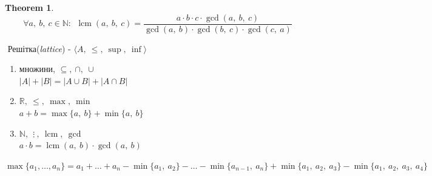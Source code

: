 \documentclass[a4paper,12pt, centered]{bookest}
\newtheorem{theorem}{Theorem}[section]
\DeclareMathOperator{\lcm}{lcm}
\begin{document}
\begin{theorem}
$$\forall a,\>b,\>c\in\mathbb{N}:\>\>\lcm(a,\>b,\>c)=\dfrac{a\cdot b\cdot c\cdot \gcd(a,\>b,\>c)}{\gcd(a,\>b)\cdot\gcd(b,\>c)\cdot\gcd(c,\>a)}$$	
\end{theorem}$ $
Решітка(\emph{lattice}) - $\langle A,\>\leq,\>\sup,\>\inf\rangle$
\begin{example}
	\begin{enumerate}
		\item множини, $\subseteq,\>\cap,\>\cup$\\
		$|A|+|B|=|A\cup B|+|A\cap B|$
		\item $\mathbb{R},\>\leq,\>\max,\>\min$\\
		$a+b=\max\{a,\>b\}+\min\{a,\>b\}$
		\item $\mathbb{N},\>\>\vdots\>,\>\lcm,\>\gcd$\\
		$a\cdot b=\lcm(a,\>b)\cdot\gcd(a,\>b)$
	\end{enumerate}
	$\max \{a_1,\dots,a_n\}=a_1+\dots+a_n-\min\{a_1,\>a_2\}-\dots-\min\{a_{n-1},\>a_n\}+\min\{a_1,\>a_2,\>a_3\}-\min\{a_1,\>a_2,\>a_3,\>a_4\}$	
\end{example}	
\end{document}
